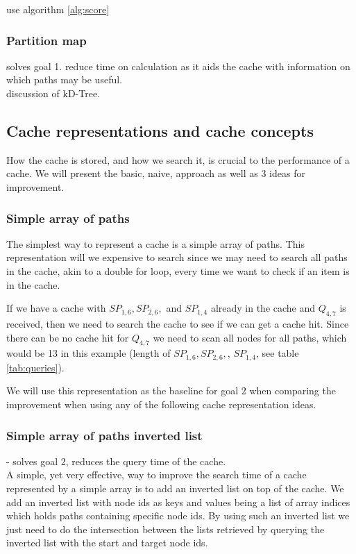 
use algorithm \ref{alg:score}


\subsubsection{Partition map} 
solves goal 1. reduce time on \spath calculation as it aids the cache with information on which paths may be useful.\\ 
discussion of kD-Tree.


\subsection{Cache representations and cache concepts} \label{subsec:cacherepresentatons}
How the cache is stored, and how we search it, is crucial to the performance of a cache. We will present the basic, naive, approach as well as 3 ideas for improvement.

\subsubsection{Simple array of paths}%
The simplest way to represent a cache is a simple array of paths. This representation will we expensive to search since we may need to search all paths in the cache, akin to a double for loop, every time we want to check if an item is in the cache.

If we have a cache with $SP_{1,6},SP_{2,6},$ and $SP_{1,4}$ already in the cache and $Q_{4,7}$ is received, then we need to search the cache to see if we can get a cache hit. Since there can be no cache hit for $Q_{4,7}$ we need to scan all nodes for all paths, which would be 13 in this example (length of $SP_{1,6},SP_{2,6},$, $SP_{1,4}$, see table \ref{tab:queries}).

We will use this representation as the baseline for goal 2 when comparing the improvement when using any of the following cache representation ideas.

\subsubsection{Simple array of paths inverted list} - solves goal 2, reduces the query time of the cache.\\
A simple, yet very effective, way to improve the search time of a cache represented by a simple array is to add an inverted list on top of the cache. We add an inverted list with node ids as keys and values being a list of array indices which holds paths containing specific node ids. By using such an inverted list we just need to do the intersection between the lists retrieved by querying the inverted list with the start and target node ids. 


